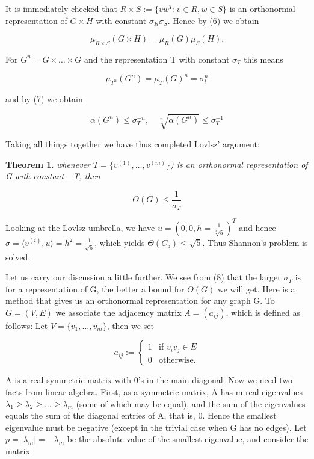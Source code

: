 \documentclass[12pt]{memoir}
\newtheorem{thm}{Theorem}
\newcommand{\setnewpagemargins}{
    \clearpage
    \checkandfixthelayout
}
\begin{document}
It is immediately checked that $R \times S := \{vw^T : v \in R, w \in S\}$ is an
orthonormal representation of $G \times H$ with constant $\sigma_R \sigma_S$. Hence by (6) 
we obtain 

\[
\mu_{R \times S}(G \times H) = \mu_{R}(G)\mu_{S}(H).
\]

For $G^n = G \times \ldots \times G$ and the representation T with constant $\sigma_T$ this
means 

\[
\mu_{T^n}(G^n) = \mu_{T}(G)^n = \sigma_{t}^n
\]

and by (7) we obtain


\[
\alpha(G^n) \leq \sigma_{T}^{-n},  \quad   \sqrt[n]{\alpha(G^n)} \leq \sigma_{T}^{-1}
\]

Taking all things together we have thus completed Lovlsz' argument: 


\begin{thm}\label{theorem}
whenever $T = \{v^{(1)}, \ldots, v^{(m)}\}$) is an orthonormal 
representation of G with constant \sigma_T, then

\begin{equation}
    \Theta(G) \leq {\frac{1}{\sigma_T}}  \label{eight}
\end{equation}

\end{thm}

Looking at the Lovlsz umbrella, we have $u = (0, 0, h = {\frac{1}{\sqrt[4]{5}}})^T$ and hence
$\sigma = \langle v^{(i)}, u \rangle = h^2 = {\frac{1}{\sqrt{5}}}$, which yields $\Theta(C_5) \leq \sqrt{5}$. Thus Shannon's 
problem is solved.


\setnewpagemargins

Let us carry our discussion a little further. We see from (8) that the larger $\sigma_T$
is for a representation of G, the better a bound for $\Theta(G)$ we will get. Here 
is a method that gives us an orthonormal representation for any graph G. 
To $G = (V, E)$ we associate the adjacency matrix $A = (a_{ij})$, which is 
defined as follows: Let $V = \{v_1,\ldots,v_m\}$, then we set

\[
a_{ij} := \left\{ \begin{array}{rcl}
  1 & \mbox{if $v_i v_j \in E$}\\
  0 & \mbox{otherwise.}
  \end{array}\right.
\]

A is a real symmetric matrix with 0's in the main diagonal. 
Now we need two facts from linear algebra. First, as a symmetric matrix, 
A has m real eigenvalues $\lambda_1 \geq \lambda_2 \geq \ldots \geq \lambda_m$ \spaceskip(some of which may 
be equal), and the sum of the eigenvalues equals the sum of the diagonal 
entries of A, that is, 0. Hence the smallest eigenvalue must be negative 
(except in the trivial case when G has no edges). Let $p = |\lambda_m| = -\lambda_m$ \spaceskip be 
the absolute value of the smallest eigenvalue, and consider the matrix
\end{document}
